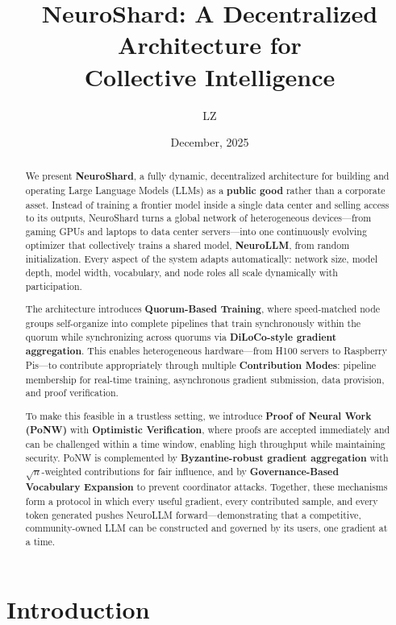 \documentclass[11pt,a4paper]{article}
\title{\textbf{NeuroShard: A Decentralized Architecture for\\Collective Intelligence}}
\author{LZ}
\date{December, 2025}
\begin{document}
\maketitle

\begin{abstract}
We present \textbf{NeuroShard}, a fully dynamic, decentralized architecture for building and operating Large Language Models (LLMs) as a \textbf{public good} rather than a corporate asset. Instead of training a frontier model inside a single data center and selling access to its outputs, NeuroShard turns a global network of heterogeneous devices---from gaming GPUs and laptops to data center servers---into one continuously evolving optimizer that collectively trains a shared model, \textbf{NeuroLLM}, from random initialization. Every aspect of the system adapts automatically: network size, model depth, model width, vocabulary, and node roles all scale dynamically with participation.

The architecture introduces \textbf{Quorum-Based Training}, where speed-matched node groups self-organize into complete pipelines that train synchronously within the quorum while synchronizing across quorums via \textbf{DiLoCo-style gradient aggregation}. This enables heterogeneous hardware---from H100 servers to Raspberry Pis---to contribute appropriately through multiple \textbf{Contribution Modes}: pipeline membership for real-time training, asynchronous gradient submission, data provision, and proof verification.

To make this feasible in a trustless setting, we introduce \textbf{Proof of Neural Work (PoNW)} with \textbf{Optimistic Verification}, where proofs are accepted immediately and can be challenged within a time window, enabling high throughput while maintaining security. PoNW is complemented by \textbf{Byzantine-robust gradient aggregation} with $\sqrt{n}$-weighted contributions for fair influence, and by \textbf{Governance-Based Vocabulary Expansion} to prevent coordinator attacks. Together, these mechanisms form a protocol in which every useful gradient, every contributed sample, and every token generated pushes NeuroLLM forward---demonstrating that a competitive, community-owned LLM can be constructed and governed by its users, one gradient at a time.
\end{abstract}

\tableofcontents
\newpage

\section{Introduction}
\end{document}
